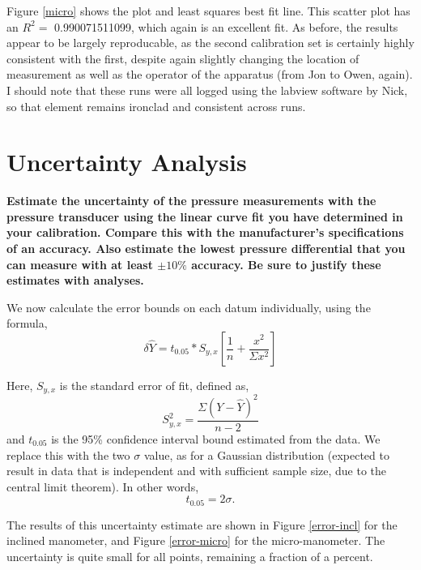 \documentclass{article}
\begin{document}
Figure \ref{micro} shows the plot and least squares best fit line. 
This scatter plot has an $R^2 =$ 0.990071511099, which again is an
excellent fit. As before, the results appear to be largely reproducable,
as the second calibration set is certainly highly consistent with the
first, despite again slightly changing the location of measurement as
well as the operator of the apparatus (from Jon to Owen, again). I
should note that these runs were all logged using the labview software
by Nick, so that element remains ironclad and consistent across runs. 

\newpage
\section{Uncertainty Analysis}

\textbf{Estimate the uncertainty of the pressure measurements with the
pressure transducer using the linear curve fit you have determined in
your calibration. Compare this with the manufacturer's specifications of
an accuracy. Also estimate the lowest pressure differential that you can
measure with at least $\pm 10\%$ accuracy. Be sure to justify these
estimates with analyses.}

We now calculate the error bounds on each datum individually, using the formula, 
\begin{equation}
  \delta \hat Y = t_{0.05} * S_{y,x} \left[ \frac{1}{n} + \frac{x^2}{\Sigma x^2} \right]
\end{equation}

Here, $S_{y,x}$ is the standard error of fit, defined as, 
\begin{equation}
  S_{y,x}^2 = \frac{\Sigma (Y-\hat Y)^2}{n-2}
\end{equation}
and $t_{0.05}$ is the 95\% confidence interval bound estimated from the data. 
We replace this with the two $\sigma$ value, as for a Gaussian distribution 
(expected to result in data that is independent and with sufficient sample 
size, due to the central limit theorem). In other words, 
\begin{equation}
  t_{0.05} = 2 \sigma.
\end{equation}

The results of this uncertainty estimate are shown in Figure \ref{error-incl} 
for the inclined manometer, and  Figure \ref{error-micro} for the micro-manometer. 
The uncertainty is quite small for all points, remaining a fraction of a percent. 
\end{document}
